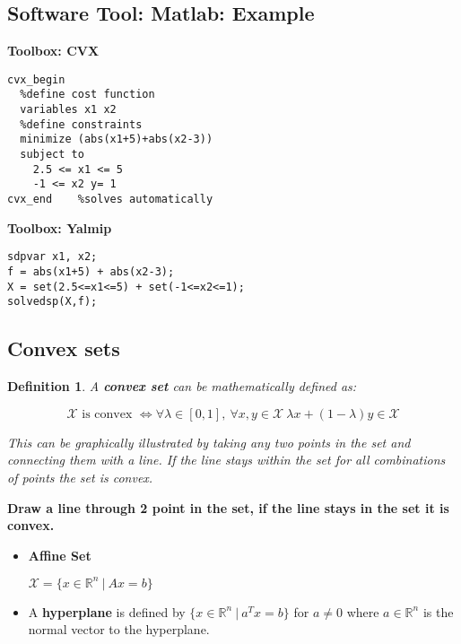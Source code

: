 \documentclass[8pt,a4paper]{scrartcl}
\newtheorem{define}{Definition}
\begin{document}
\begin{multicols*}{3}
\subsection{Software Tool: Matlab: Example}


\textbf{Toolbox: CVX}

\begin{verbatim}
cvx_begin
  %define cost function
  variables x1 x2
  %define constraints
  minimize (abs(x1+5)+abs(x2-3))
  subject to
    2.5 <= x1 <= 5
    -1 <= x2 y= 1
cvx_end    %solves automatically
\end{verbatim}

\textbf{Toolbox: Yalmip}

\begin{verbatim}
sdpvar x1, x2;
f = abs(x1+5) + abs(x2-3);
X = set(2.5<=x1<=5) + set(-1<=x2<=1);
solvedsp(X,f);
\end{verbatim}

\subsection{Convex sets}

\begin{define}
A \textbf{convex set} can be mathematically defined as:

\[\mathcal{X}\text{ is convex }\Leftrightarrow\forall \lambda\in[0,1],\ \forall x,y\in\mathcal{X}\ \lambda x+(1-\lambda)y\in\mathcal{X}\]

This can be graphically illustrated by taking any two points in the set and connecting them with a line. If the line stays within the set for all combinations of points the set is convex.
\end{define}

\textbf{Draw a line through 2 point in the set, if the line stays in the set it is convex.}

\begin{itemize}
\item \textbf{Affine Set}

$\mathcal{X}=\{x\in\mathbb{R}^n\ |\ Ax=b\}$

\item A \textbf{hyperplane} is defined by $\{x\in\mathbb{R}^n\ |\ a^Tx=b\}$ for $a\neq 0$ where $a\in\mathbb{R}^n$ is the normal vector to the hyperplane.


\end{itemize}
\end{multicols*}
\end{document}
